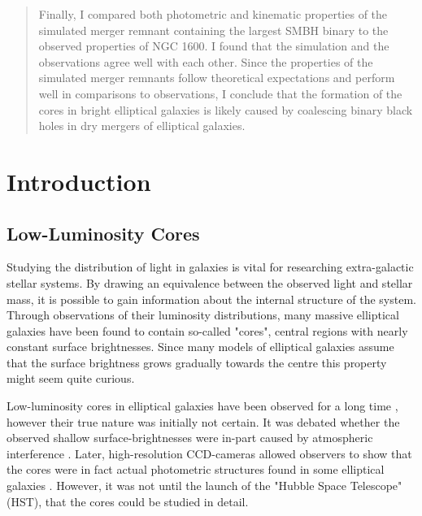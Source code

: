 \documentclass[english, twoside]{HYgradu}
\begin{document}
\begin{abstract}
Finally, I compared both photometric and kinematic properties of the simulated merger remnant containing the largest SMBH binary to the observed properties of NGC 1600. I found that the simulation and the observations agree well with each other. Since the properties of the simulated merger remnants follow theoretical expectations and perform well in comparisons to observations, I conclude that the formation of the cores in bright elliptical galaxies is likely caused by coalescing binary black holes in dry mergers of elliptical galaxies.


\end{abstract}

\mytableofcontents



\chapter{Introduction}

\section{Low-Luminosity Cores}

Studying the distribution of light in galaxies is vital for researching extra-galactic stellar systems. By drawing an equivalence between the observed light and stellar mass, it is possible to gain information about the internal structure of the system. Through observations of their luminosity distributions, many massive elliptical galaxies have been found to contain so-called "cores", central regions with nearly constant surface brightnesses. Since many models of elliptical galaxies assume that the surface brightness grows gradually towards the centre \citep[e.g.][]{deVaucouleurs1948, Sersic1968} this property might seem quite curious.

Low-luminosity cores in elliptical galaxies have been observed for a long time \citep[e.g.][]{King1966}, however their true nature was initially not certain. It was debated whether the observed shallow surface-brightnesses were in-part caused by atmospheric interference \citep{King1978, Schweizer1979}. Later, high-resolution CCD-cameras allowed observers to show that the cores were in fact actual photometric structures found in some elliptical galaxies \citep{Lauer1985, Kormendy1985}. However, it was not until the launch of the "Hubble Space Telescope" (HST), that the cores could be studied in detail.
\end{document}

